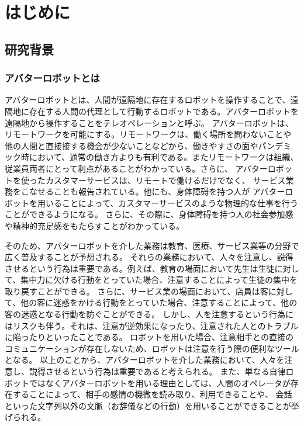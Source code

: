\documentclass[11pt,a4j]{jreport}
\begin{document}

\tableofcontents

\pagestyle{fancy}
\lhead{\rightmark}
\renewcommand{\chaptermark}[1]{\markboth{第\ \normalfont\thechapter\ 章~~#1}{}}

\chapter{はじめに} %

\section{研究背景} %
\subsection{アバターロボットとは} %
アバターロボットとは、人間が遠隔地に存在するロボットを操作することで、遠隔地に存在する人間の代理として行動するロボットである。アバターロボットを遠隔地から操作することをテレオペレーションと呼ぶ。
アバターロボットは、リモートワークを可能にする。リモートワークは、働く場所を問わないことや
他の人間と直接接する機会が少ないことなどから、働きやすさの面やパンデミック時において、通常の働き方よりも有利である。またリモートワークは組織、従業員両者にとって利点があることがわかっている\cite{FERREIRA202170}。さらに、
アバターロボットを使ったカスタマーサービスは、リモートで働けるだけでなく、
サービス業務をこなせることも報告されている\cite{Kanda2010}。他にも、身体障碍を持つ人が
アバターロボットを用いることによって、カスタマーサービスのような物理的な仕事を行うことができるようになる。
さらに、その際に、身体障碍を持つ人の社会参加感や精神的充足感をもたらすことがわかっている\cite{takeuchi2020avatar}。

そのため、アバターロボットを介した業務は教育、医療、サービス業等の分野で広く普及することが予想される。
それらの業務において、人々を注意し、説得させるという行為は重要である。例えば、教育の場面において先生は生徒に対して、集中力に欠ける行動をとっていた場合、注意することによって生徒の集中を取り戻すことができる。
さらに、サービス業の場面において、店員は客に対して、他の客に迷惑をかける行動をとっていた場合、注意することによって、他の客の迷惑となる行動を防ぐことができる。
しかし、人を注意するという行為にはリスクも伴う。それは、注意が逆効果になったり、注意された人とのトラブルに陥ったりといったことである。
ロボットを用いた場合、注意相手との直接のコミュニケーションが存在しないため、ロボットは注意を行う際の便利なツールとなる。
以上のことから、アバターロボットを介した業務において、人々を注意し、説得させるという行為は重要であると考えられる。
また、単なる自律ロボットではなくアバターロボットを用いる理由としては、人間のオペレータが存在することによって、相手の感情の機微を読み取り、利用できることや、
会話といった文字列以外の文脈（お辞儀などの行動）を用いることができることが挙げられる。
\end{document}
